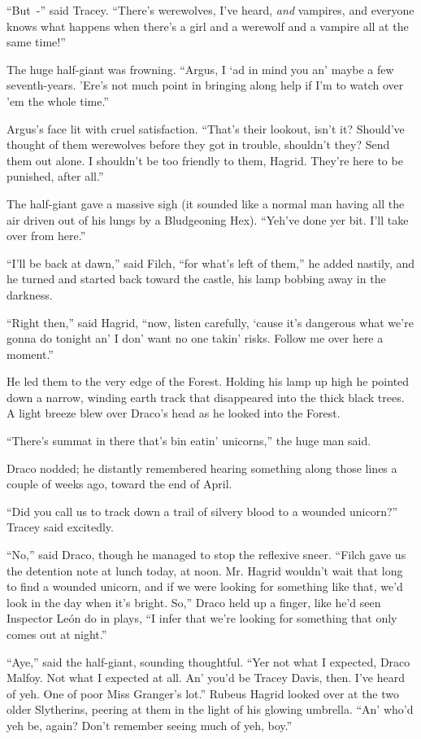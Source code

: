 ``But~-'' said Tracey. ``There's werewolves, I've heard, \emph{and} vampires, and everyone knows what happens when there's a girl and a werewolf and a vampire all at the same time!''

The huge half-giant was frowning. ``Argus, I `ad in mind you an' maybe a few seventh-years. 'Ere's not much point in bringing along help if I'm to watch over 'em the whole time.''

Argus's face lit with cruel satisfaction. ``That's their lookout, isn't it? Should've thought of them werewolves before they got in trouble, shouldn't they? Send them out alone. I shouldn't be too friendly to them, Hagrid. They're here to be punished, after all.''

The half-giant gave a massive sigh (it sounded like a normal man having all the air driven out of his lungs by a Bludgeoning Hex). ``Yeh've done yer bit. I'll take over from here.''

``I'll be back at dawn,'' said Filch, ``for what's left of them,'' he added nastily, and he turned and started back toward the castle, his lamp bobbing away in the darkness.

``Right then,'' said Hagrid, ``now, listen carefully, `cause it's dangerous what we're gonna do tonight an' I don' want no one takin' risks. Follow me over here a moment.''

He led them to the very edge of the Forest. Holding his lamp up high he pointed down a narrow, winding earth track that disappeared into the thick black trees. A light breeze blew over Draco's head as he looked into the Forest.

``There's summat in there that's bin eatin' unicorns,'' the huge man said.

Draco nodded; he distantly remembered hearing something along those lines a couple of weeks ago, toward the end of April.

``Did you call us to track down a trail of silvery blood to a wounded unicorn?'' Tracey said excitedly.

``No,'' said Draco, though he managed to stop the reflexive sneer. ``Filch gave us the detention note at lunch today, at noon. Mr. Hagrid wouldn't wait that long to find a wounded unicorn, and if we were looking for something like that, we'd look in the day when it's bright. So,'' Draco held up a finger, like he'd seen Inspector León do in plays, ``I infer that we're looking for something that only comes out at night.''

``Aye,'' said the half-giant, sounding thoughtful. ``Yer not what I expected, Draco Malfoy. Not what I expected at all. An' you'd be Tracey Davis, then. I've heard of yeh. One of poor Miss Granger's lot.'' Rubeus Hagrid looked over at the two older Slytherins, peering at them in the light of his glowing umbrella. ``An' who'd yeh be, again? Don't remember seeing much of yeh, boy.''

